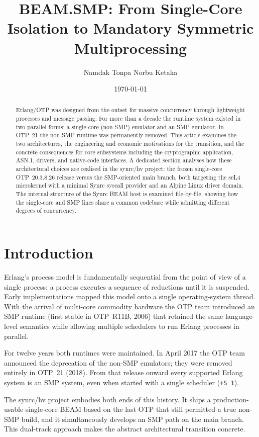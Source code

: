 \documentclass{article}
\title{BEAM.SMP: From Single-Core Isolation to Mandatory Symmetric Multiprocessing}
\author{Namdak Tonpa Norbu Ketaka}
\date{\today}
\begin{document}
\maketitle

\begin{abstract}
Erlang/OTP was designed from the outset for massive concurrency through lightweight processes and message passing.
For more than a decade the runtime system existed in two parallel forms: a single-core (non-SMP) emulator and an SMP emulator.
In OTP~21 the non-SMP runtime was permanently removed.
This article examines the two architectures, the engineering and economic motivations for the transition,
and the concrete consequences for core subsystems including the cryptographic application, ASN.1, drivers, and native-code interfaces.
A dedicated section analyses how these architectural choices are realised in the synrc/hv project: the frozen single-core OTP~20.3.8.26 release versus the SMP-oriented main branch, both targeting the seL4 microkernel with a minimal Synrc syscall provider and an Alpine Linux driver domain.
The internal structure of the Synrc BEAM host is examined file-by-file, showing how the single-core and SMP lines share a common codebase while admitting different degrees of concurrency.
\end{abstract}

\newpage
\tableofcontents

\newpage
\section{Introduction}

Erlang's process model is fundamentally sequential from the point of view of a single process: a process executes a sequence of reductions until it is suspended.
Early implementations mapped this model onto a single operating-system thread.
With the arrival of multi-core commodity hardware the OTP team introduced an SMP runtime (first stable in OTP~R11B, 2006) that retained the same language-level semantics while allowing multiple schedulers to run Erlang processes in parallel.

For twelve years both runtimes were maintained.
In April 2017 the OTP team announced the deprecation of the non-SMP emulators; they were removed entirely in OTP~21 (2018).
From that release onward every supported Erlang system is an SMP system, even when started with a single scheduler (\texttt{+S 1}).

The synrc/hv project embodies both ends of this history.
It ships a production-usable single-core BEAM based on the last OTP that still permitted a true non-SMP build, and it simultaneously develops an SMP path on the main branch.
This dual-track approach makes the abstract architectural transition concrete.
\end{document}

